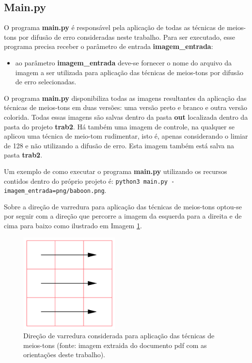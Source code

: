 \documentclass{article}
\begin{document}
%
\subsection{Main.py}
O programa \textbf{main.py} é responsável pela aplicação de todas as técnicas de meios-tons por difusão de erro consideradas neste trabalho. Para ser executado, esse programa precisa receber o parâmetro de entrada \textbf{imagem\_entrada}:

\begin{itemize}
	\item ao parâmetro \textbf{imagem\_entrada} deve-se fornecer o nome do arquivo da imagem a ser utilizada para aplicação das técnicas de meios-tons por difusão de erro selecionadas.
\end{itemize}
	
\noindent

O programa \textbf{main.py} disponibiliza todas as imagens resultantes da aplicação das técnicas de meios-tons em duas versões: uma versão preto e branco e outra versão colorida. Todas essas imagens são salvas dentro da pasta \textbf{out} localizada dentro da pasta do projeto \textbf{trab2}. Há também uma imagem de controle, na qualquer se aplicou uma técnica de meio-tom rudimentar, isto é, apenas considerando o limiar de 128 e não utilizando a difusão de erro. Esta imagem também está salva na pasta \textbf{trab2}.

Um exemplo de como executar o programa \textbf{main.py} utilizando os recursos contidos dentro do próprio projeto é: \lstinline{python3 main.py -imagem_entrada=png/baboon.png}.

Sobre a direção de varredura para aplicação das técnicas de meios-tons optou-se por seguir com a direção que percorre a imagem da esquerda para a direita e de cima para baixo como ilustrado em Imagem \ref{fig:direcao_varredura}.

\begin{figure}[htp]%
	\centering
	\includegraphics[width=5cm]{./varredura.png} %
	\caption{Direção de varredura considerada para aplicação das técnicas de meios-tons (fonte: imagem extraida do documento pdf com as orientações deste trabalho).}%
	\label{fig:direcao_varredura}%
\end{figure}
\end{document}
